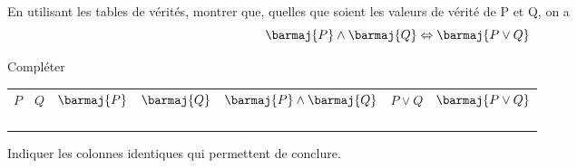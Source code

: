 \begin{exercice}

	En utilisant les tables de vérités, montrer que, quelles que soient les valeurs de vérité de P et Q, on a $$\barmaj{P} \wedge \barmaj{Q} \Leftrightarrow \barmaj{P\vee Q}$$
	
	Compléter
	
	\begin{center}
		\tabstyled
		\begin{tabular}{|c|c|c|c|c|c|c|}
			
			\ccell $P$ & \ccell $Q$ & \ccell$\barmaj{P}$ & \ccell$\barmaj{Q}$ & \ccell$\barmaj{P} \wedge \barmaj{Q}$ & \ccell$P\vee Q$ & \ccell$\barmaj{P\vee Q}$ \\
			         &          &                    &                    &                                      &                 &                          \\
			         &          &                    &                    &                                      &                 &                          \\
			         &          &                    &                    &                                      &                 &                          \\
			         &          &                    &                    &                                      &                 &                          \\
		\end{tabular}
	\end{center}
	Indiquer les colonnes identiques qui permettent de conclure.
\end{exercice}

